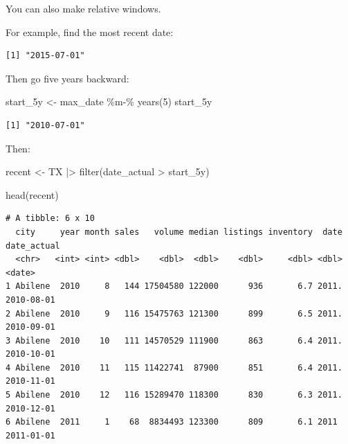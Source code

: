 \documentclass[
  letterpaper,
  DIV=11,
  numbers=noendperiod]{scrreprt}
\newenvironment{Shaded}{\begin{snugshade}}{\end{snugshade}}
\newcommand{\AttributeTok}[1]{\textcolor[rgb]{0.40,0.45,0.13}{#1}}
\newcommand{\ConstantTok}[1]{\textcolor[rgb]{0.56,0.35,0.01}{#1}}
\newcommand{\DecValTok}[1]{\textcolor[rgb]{0.68,0.00,0.00}{#1}}
\newcommand{\FunctionTok}[1]{\textcolor[rgb]{0.28,0.35,0.67}{#1}}
\newcommand{\NormalTok}[1]{\textcolor[rgb]{0.00,0.23,0.31}{#1}}
\newcommand{\OtherTok}[1]{\textcolor[rgb]{0.00,0.23,0.31}{#1}}
\newcommand{\SpecialCharTok}[1]{\textcolor[rgb]{0.37,0.37,0.37}{#1}}
\begin{document}
You can also make relative windows.

For example, find the most recent date:

\begin{Shaded}
\end{Shaded}

\begin{verbatim}
[1] "2015-07-01"
\end{verbatim}

Then go five years backward:

\begin{Shaded}
\begin{Highlighting}[]
\NormalTok{start\_5y }\OtherTok{\textless{}{-}}\NormalTok{ max\_date }\SpecialCharTok{\%m{-}\%} \FunctionTok{years}\NormalTok{(}\DecValTok{5}\NormalTok{)}
\NormalTok{start\_5y}
\end{Highlighting}
\end{Shaded}

\begin{verbatim}
[1] "2010-07-01"
\end{verbatim}

Then:

\begin{Shaded}
\begin{Highlighting}[]
\NormalTok{recent }\OtherTok{\textless{}{-}}\NormalTok{ TX }\SpecialCharTok{|\textgreater{}}
    \FunctionTok{filter}\NormalTok{(date\_actual }\SpecialCharTok{\textgreater{}}\NormalTok{ start\_5y)}

\FunctionTok{head}\NormalTok{(recent)}
\end{Highlighting}
\end{Shaded}

\begin{verbatim}
# A tibble: 6 x 10
  city     year month sales   volume median listings inventory  date date_actual
  <chr>   <int> <int> <dbl>    <dbl>  <dbl>    <dbl>     <dbl> <dbl> <date>     
1 Abilene  2010     8   144 17504580 122000      936       6.7 2011. 2010-08-01 
2 Abilene  2010     9   116 15475763 121300      899       6.5 2011. 2010-09-01 
3 Abilene  2010    10   111 14570529 111900      863       6.4 2011. 2010-10-01 
4 Abilene  2010    11   115 11422741  87900      851       6.4 2011. 2010-11-01 
5 Abilene  2010    12   116 15289470 118300      830       6.3 2011. 2010-12-01 
6 Abilene  2011     1    68  8834493 123300      809       6.1 2011  2011-01-01 
\end{verbatim}
\end{document}
